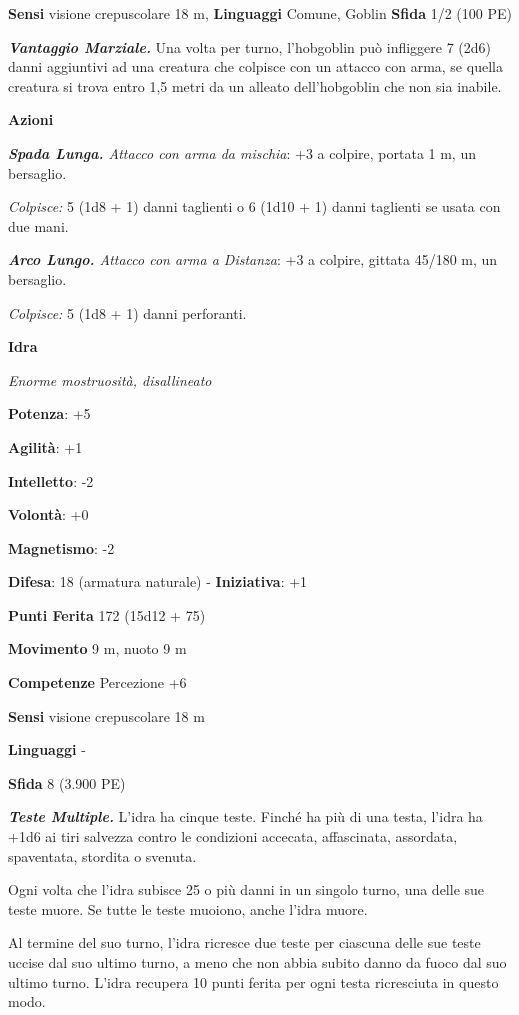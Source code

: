 \begin{multicols}{2}
\textbf{Sensi} visione crepuscolare 18 m, 
\textbf{Linguaggi} Comune, Goblin \textbf{Sfida} 1/2 (100 PE)\smallskip

\emph{\textbf{Vantaggio Marziale.}} Una volta per turno, l'hobgoblin può
infliggere 7 (2d6) danni aggiuntivi ad una creatura che colpisce con un
attacco con arma, se quella creatura si trova entro 1,5 metri da un
alleato dell'hobgoblin che non sia inabile.

\smallskip\textbf{Azioni}

\emph{\textbf{Spada Lunga.} Attacco con arma da mischia}: +3 a colpire,
portata 1 m, un bersaglio.

\emph{Colpisce:} 5 (1d8 + 1) danni taglienti o 6 (1d10 + 1) danni
taglienti se usata con due mani.

\emph{\textbf{Arco Lungo.} Attacco con arma a Distanza}: +3 a colpire,
gittata 45/180 m, un bersaglio.

\emph{Colpisce:} 5 (1d8 + 1) danni perforanti.



\textbf{Idra}

\emph{Enorme mostruosità, disallineato}

\textbf{Potenza}: +5

\textbf{Agilità}: +1

\textbf{Intelletto}: -2

\textbf{Volontà}: +0

\textbf{Magnetismo}: -2

\textbf{Difesa}: 18 (armatura naturale) - \textbf{Iniziativa}: +1

\textbf{Punti Ferita} 172 (15d12 + 75)

\textbf{Movimento} 9 m, nuoto 9 m

\textbf{Competenze} Percezione +6

\textbf{Sensi} visione crepuscolare 18 m

\textbf{Linguaggi} -

\textbf{Sfida} 8 (3.900 PE)\smallskip

\emph{\textbf{Teste Multiple.}} L'idra ha cinque teste. Finché ha più di
una testa, l'idra ha +1d6 ai tiri salvezza contro le condizioni
accecata, affascinata, assordata, spaventata, stordita o svenuta.

Ogni volta che l'idra subisce 25 o più danni in un singolo turno, una
delle sue teste muore. Se tutte le teste muoiono, anche l'idra muore.

Al termine del suo turno, l'idra ricresce due teste per ciascuna delle
sue teste uccise dal suo ultimo turno, a meno che non abbia subito danno
da fuoco dal suo ultimo turno. L'idra recupera 10 punti ferita per ogni
testa ricresciuta in questo modo.


\end{multicols}
